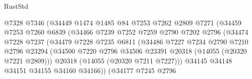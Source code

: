\begin{lexlean}{RustStd}
\begin{coremodule}
                                  @7328
                                  @7346
                                  (@34449
                                    @1474
                                    @1485
                                    @84
                                    @7253
                                    @7262
                                    @2809
                                    @7271
                                    (@34459
                                      @7253
                                      @7260
                                      @6839
                                      (@34466
                                        @7239
                                        @7252
                                        @7259
                                        @2790
                                        @7202
                                        @2796
                                        (@34474
                                          @7228
                                          @7237
                                          (@34479
                                            @7228
                                            @7235
                                            @6811
                                            (@34486
                                              @7227
                                              @7234
                                              @2790
                                              @7210
                                              @2796
                                              @23294
                                              (@34500
                                                @7220
                                                @2796
                                                @34506
                                                @23391
                                                @20318
                                                (@14055 (@20320 @7221 @2809)))
                                              @20318
                                              (@14055 (@20320 @7211 @7227)))
                                            @34145
                                            @34148
                                            @34151
                                            @34155
                                            @34160
                                            @34166))
                                        (@34177
                                          @7245
                                          @2796

\end{coremodule}
\end{lexlean}
